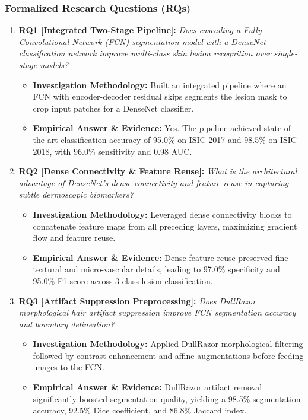 \subsubsection*{Formalized Research Questions (RQs)}
\begin{enumerate}[label=\textbf{\arabic*.}, leftmargin=*]
  \item \textbf{RQ1 [Integrated Two-Stage Pipeline]:} \textit{Does cascading a Fully Convolutional Network (FCN) segmentation model with a DenseNet classification network improve multi-class skin lesion recognition over single-stage models?}
  \begin{itemize}[leftmargin=1.5em]
    \item \textbf{Investigation Methodology:} Built an integrated pipeline where an FCN with encoder-decoder residual skips segments the lesion mask to crop input patches for a DenseNet classifier.
    \item \textbf{Empirical Answer \& Evidence:} Yes. The pipeline achieved state-of-the-art classification accuracy of 95.0\% on ISIC 2017 and 98.5\% on ISIC 2018, with 96.0\% sensitivity and 0.98 AUC.
  \end{itemize}
  \item \textbf{RQ2 [Dense Connectivity \& Feature Reuse]:} \textit{What is the architectural advantage of DenseNet's dense connectivity and feature reuse in capturing subtle dermoscopic biomarkers?}
  \begin{itemize}[leftmargin=1.5em]
    \item \textbf{Investigation Methodology:} Leveraged dense connectivity blocks to concatenate feature maps from all preceding layers, maximizing gradient flow and feature reuse.
    \item \textbf{Empirical Answer \& Evidence:} Dense feature reuse preserved fine textural and micro-vascular details, leading to 97.0\% specificity and 95.0\% F1-score across 3-class lesion classification.
  \end{itemize}
  \item \textbf{RQ3 [Artifact Suppression Preprocessing]:} \textit{Does DullRazor morphological hair artifact suppression improve FCN segmentation accuracy and boundary delineation?}
  \begin{itemize}[leftmargin=1.5em]
    \item \textbf{Investigation Methodology:} Applied DullRazor morphological filtering followed by contrast enhancement and affine augmentations before feeding images to the FCN.
    \item \textbf{Empirical Answer \& Evidence:} DullRazor artifact removal significantly boosted segmentation quality, yielding a 98.5\% segmentation accuracy, 92.5\% Dice coefficient, and 86.8\% Jaccard index.

\end{itemize}
\end{enumerate}

